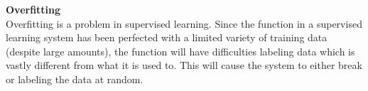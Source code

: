 \textbf{Overfitting} \\
Overfitting is a problem in supervised learning. Since the function in a supervised learning system has been perfected with a limited variety of training data (despite large amounts), the function will have difficulties labeling data which is vastly different from what it is used to. This will cause the system to either break or labeling the data at random.




